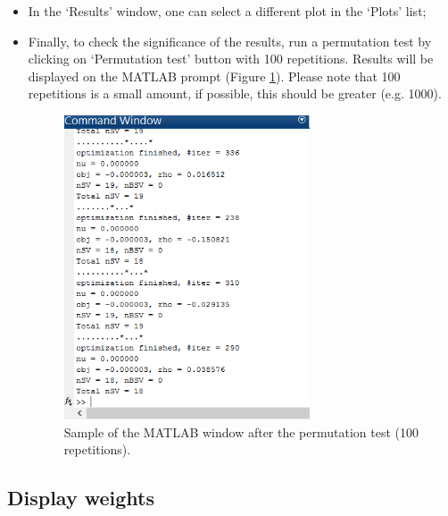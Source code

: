 \begin{itemize}
	\item In the `Results' window, one can select a different plot in the `Plots' list;
	
	
	\item Finally, to check the significance of the results, run a permutation test by clicking on `Permutation test' button with 100 repetitions. Results will be displayed on the MATLAB prompt (Figure \ref{fig:permutations}). Please note that 100 repetitions is a small amount, if possible, this should be greater (e.g. 1000).

\begin{figure}[h!]
	\centering
		\includegraphics[height=9cm]{images/Tutorial/classification/permutations.png}
	\caption{Sample of the MATLAB window after the permutation test (100 repetitions).}
	\label{fig:permutations}
\end{figure}

\end{itemize}
	

\subsection{Display weights}

